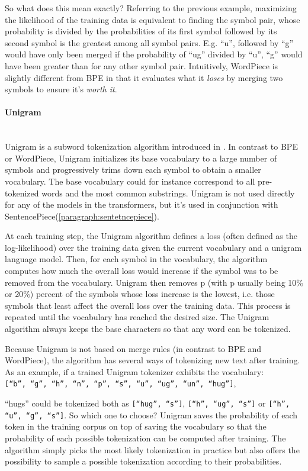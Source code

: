 So what does this mean exactly? Referring to the previous example, maximizing the likelihood of the training data is equivalent to finding the symbol pair, whose probability is divided by the probabilities of its first symbol followed by its second symbol is the greatest among all symbol pairs. E.g. ``u'', followed by ``g'' would have only been merged if the probability of ``ug'' divided by ``u'', ``g'' would have been greater than for any other symbol pair. Intuitively, WordPiece is slightly different from BPE in that it evaluates what it \textit{loses} by merging two symbols to ensure it's \textit{worth it}.

\paragraph{Unigram}\mbox{}\\
Unigram is a subword tokenization algorithm introduced in \citep{kudo2018subword}. In contrast to BPE or WordPiece, Unigram initializes its base vocabulary to a large number of symbols and progressively trims down each symbol to obtain a smaller vocabulary. The base vocabulary could for instance correspond to all pre-tokenized words and the most common substrings. Unigram is not used directly for any of the models in the transformers, but it's used in conjunction with SentencePiece(\autoref{paragraph:sentetncepiece}).

At each training step, the Unigram algorithm defines a loss (often defined as the log-likelihood) over the training data given the current vocabulary and a unigram language model. Then, for each symbol in the vocabulary, the algorithm computes how much the overall loss would increase if the symbol was to be removed from the vocabulary. Unigram then removes p (with p usually being 10\% or 20\%) percent of the symbols whose loss increase is the lowest, i.e. those symbols that least affect the overall loss over the training data. This process is repeated until the vocabulary has reached the desired size. The Unigram algorithm always keeps the base characters so that any word can be tokenized.

Because Unigram is not based on merge rules (in contrast to BPE and WordPiece), the algorithm has several ways of
tokenizing new text after training. As an example, if a trained Unigram tokenizer exhibits the vocabulary:
\\
\texttt{[``b'', ``g'', ``h'', ``n'', ``p'', ``s'', ``u'', ``ug'', ``un'', ``hug'']},

``hugs'' could be tokenized both as \texttt{[``hug'', ``s'']}, \texttt{[``h'', ``ug'', ``s'']} or \texttt{[``h'', ``u'', ``g'', ``s'']}. So which one to choose? Unigram saves the probability of each token in the training corpus on top of saving the vocabulary so that the probability of each possible tokenization can be computed after training. The algorithm simply picks the most likely tokenization in practice but also offers the possibility to sample a possible tokenization according to their probabilities.

